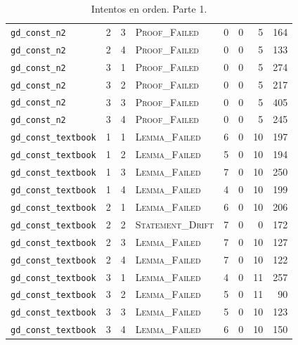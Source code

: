 \documentclass[11pt,a4paper]{article}
\begin{document}
\begin{table}[!ht]
\begin{tabular}{@{}lrrlrrrr@{}}
\texttt{gd\_\allowbreak{}const\_\allowbreak{}n2} & 2 & 3 & \textsc{Proof\_Failed} & 0 & 0 & 5 & 164 \\
\texttt{gd\_\allowbreak{}const\_\allowbreak{}n2} & 2 & 4 & \textsc{Proof\_Failed} & 0 & 0 & 5 & 133 \\
\texttt{gd\_\allowbreak{}const\_\allowbreak{}n2} & 3 & 1 & \textsc{Proof\_Failed} & 0 & 0 & 5 & 274 \\
\texttt{gd\_\allowbreak{}const\_\allowbreak{}n2} & 3 & 2 & \textsc{Proof\_Failed} & 0 & 0 & 5 & 217 \\
\texttt{gd\_\allowbreak{}const\_\allowbreak{}n2} & 3 & 3 & \textsc{Proof\_Failed} & 0 & 0 & 5 & 405 \\
\texttt{gd\_\allowbreak{}const\_\allowbreak{}n2} & 3 & 4 & \textsc{Proof\_Failed} & 0 & 0 & 5 & 245 \\
\texttt{gd\_\allowbreak{}const\_\allowbreak{}textbook} & 1 & 1 & \textsc{Lemma\_Failed} & 6 & 0 & 10 & 197 \\
\texttt{gd\_\allowbreak{}const\_\allowbreak{}textbook} & 1 & 2 & \textsc{Lemma\_Failed} & 5 & 0 & 10 & 194 \\
\texttt{gd\_\allowbreak{}const\_\allowbreak{}textbook} & 1 & 3 & \textsc{Lemma\_Failed} & 7 & 0 & 10 & 250 \\
\texttt{gd\_\allowbreak{}const\_\allowbreak{}textbook} & 1 & 4 & \textsc{Lemma\_Failed} & 4 & 0 & 10 & 199 \\
\texttt{gd\_\allowbreak{}const\_\allowbreak{}textbook} & 2 & 1 & \textsc{Lemma\_Failed} & 6 & 0 & 10 & 206 \\
\texttt{gd\_\allowbreak{}const\_\allowbreak{}textbook} & 2 & 2 & \textsc{Statement\_Drift} & 7 & 0 & 0 & 172 \\
\texttt{gd\_\allowbreak{}const\_\allowbreak{}textbook} & 2 & 3 & \textsc{Lemma\_Failed} & 7 & 0 & 10 & 127 \\
\texttt{gd\_\allowbreak{}const\_\allowbreak{}textbook} & 2 & 4 & \textsc{Lemma\_Failed} & 7 & 0 & 10 & 122 \\
\texttt{gd\_\allowbreak{}const\_\allowbreak{}textbook} & 3 & 1 & \textsc{Lemma\_Failed} & 4 & 0 & 11 & 257 \\
\texttt{gd\_\allowbreak{}const\_\allowbreak{}textbook} & 3 & 2 & \textsc{Lemma\_Failed} & 5 & 0 & 11 & 90 \\
\texttt{gd\_\allowbreak{}const\_\allowbreak{}textbook} & 3 & 3 & \textsc{Lemma\_Failed} & 5 & 0 & 10 & 123 \\
\texttt{gd\_\allowbreak{}const\_\allowbreak{}textbook} & 3 & 4 & \textsc{Lemma\_Failed} & 6 & 0 & 10 & 150 \\
\bottomrule
\end{tabular}
\caption{Intentos en orden. Parte 1.}
\label{tab:intentos-0}
\end{table}
\end{document}
